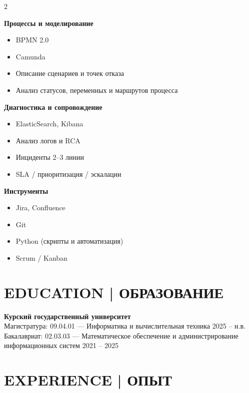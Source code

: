 \documentclass[9pt,a4paper]{article}
\begin{document}
\begin{paracol}{2}
\begin{tcolorbox}[
  breakable,
  colback=panel,
  colframe=panel,
  boxrule=0pt,
  arc=10pt,
  left=10pt,right=10pt,top=10pt,bottom=10pt
]
\textbf{Процессы и моделирование}
\begin{itemize}
  \item BPMN 2.0
  \item Camunda
  \item Описание сценариев и точек отказа
  \item Анализ статусов, переменных и маршрутов процесса
\end{itemize}

\textbf{Диагностика и сопровождение}
\begin{itemize}
  \item ElasticSearch, Kibana
  \item Анализ логов и RCA
  \item Инциденты 2--3 линии
  \item SLA / приоритизация / эскалации
\end{itemize}

\textbf{Инструменты}
\begin{itemize}
  \item Jira, Confluence
  \item Git
  \item Python (скрипты и автоматизация)
  \item Scrum / Kanban
\end{itemize}

\section*{EDUCATION | ОБРАЗОВАНИЕ}
\textbf{Курский государственный университет}\\
Магистратура: 09.04.01 --- Информатика и вычислительная техника \hfill 2025 -- н.в.\\
Бакалавриат: 02.03.03 --- Математическое обеспечение и администрирование информационных систем \hfill 2021 -- 2025

\end{tcolorbox}

\switchcolumn

\section*{EXPERIENCE | ОПЫТ}


\end{paracol}
\end{document}
